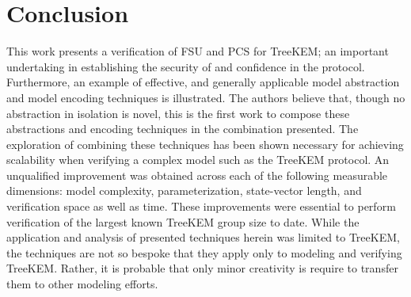 \documentclass[runningheads]{llncs}
\newcommand{\Abrev}[1]{\gls{#1}}
\begin{document}
 
\section{Conclusion}

This work presents a verification of \Abrev{FSU} and \Abrev{PCS} for TreeKEM; an important undertaking in establishing the security of and confidence in the protocol.
Furthermore, an example of effective, and generally applicable model abstraction and model encoding techniques is illustrated.
The authors believe that, though no abstraction in isolation is novel, this is the first work to compose these abstractions and encoding techniques in the combination presented.
The exploration of combining these techniques has been shown necessary for achieving scalability when verifying a complex model such as the TreeKEM protocol.
An unqualified improvement was obtained across each of the following measurable dimensions: model complexity,  parameterization, state-vector length, and verification space as well as time.
These improvements were essential to perform verification of the largest known TreeKEM group size to date.
While the application and analysis of presented techniques herein was limited to TreeKEM, the techniques are not so bespoke that they apply only to modeling and verifying TreeKEM.
Rather, it is probable that only minor creativity is require to transfer them to other modeling efforts.








\pagebreak
\end{document}
